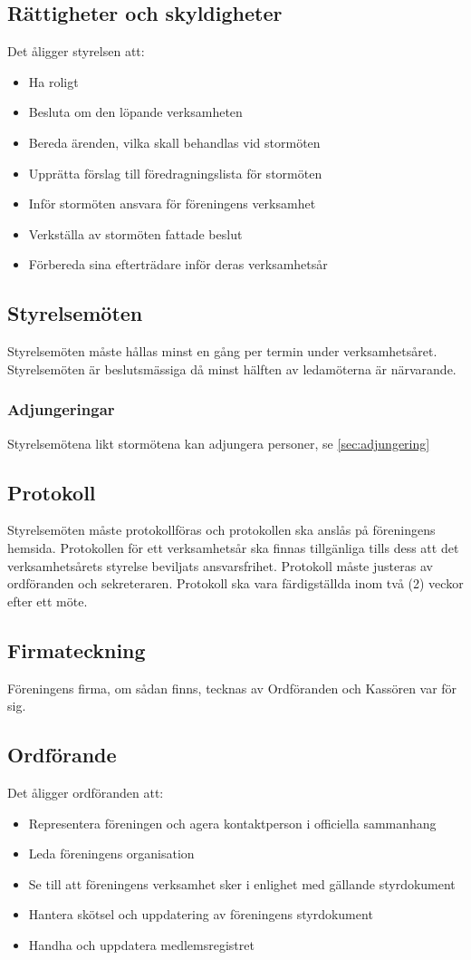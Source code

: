\documentclass[11pt,a4paper]{article}
\begin{document}
\subsection{Rättigheter och skyldigheter}
Det åligger styrelsen att:
\begin{itemize}
	\item Ha roligt
	\item Besluta om den löpande verksamheten
	\item Bereda ärenden, vilka skall behandlas vid stormöten
	\item Upprätta förslag till föredragningslista för stormöten
	\item Inför stormöten ansvara för föreningens verksamhet
	\item Verkställa av stormöten fattade beslut
	\item Förbereda sina efterträdare inför deras verksamhetsår
\end{itemize}
\subsection{Styrelsemöten}
Styrelsemöten måste hållas minst en gång per termin under verksamhetsåret. Styrelsemöten är beslutsmässiga då minst hälften av ledamöterna är närvarande.
\subsubsection{Adjungeringar}
Styrelsemötena likt stormötena kan adjungera personer, se \ref{sec:adjungering}
\subsection{Protokoll}
Styrelsemöten måste protokollföras och protokollen ska anslås på föreningens
hemsida. Protokollen för ett verksamhetsår ska finnas tillgänliga tills dess att
det verksamhetsårets styrelse beviljats ansvarsfrihet. Protokoll måste justeras
av ordföranden och sekreteraren. Protokoll ska vara färdigställda inom två (2)
veckor efter ett möte.
\subsection{Firmateckning}
Föreningens firma, om sådan finns, tecknas av Ordföranden och Kassören var för sig.
\subsection{Ordförande}\label{sec:ordf}
Det åligger ordföranden att:
\begin{itemize}
	\item Representera föreningen och agera kontaktperson i officiella sammanhang
	\item Leda föreningens organisation
	\item Se till att föreningens verksamhet sker i enlighet med gällande styrdokument
	\item Hantera skötsel och uppdatering av föreningens styrdokument
	\item Handha och uppdatera medlemsregistret
\end{itemize}
\end{document}
